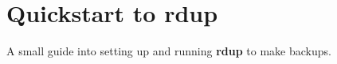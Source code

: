 \documentclass[a5paper, openany]{memoir}
\newcommand{\rdup}{\textbf{rdup}}
\begin{document}

\chapter{Quickstart to \rdup}

A small guide into setting up and running \rdup{} to make backups.
\end{document}
